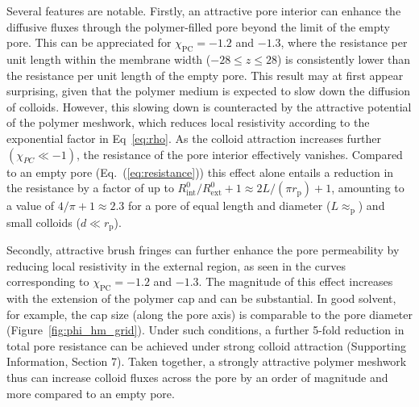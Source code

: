 \documentclass[12pt, a4paper]{article}
\begin{document}
Several features are notable. Firstly, an attractive pore interior can enhance the diffusive fluxes through the polymer-filled pore beyond the limit of the empty pore.
This can be appreciated for $\chi_{\text{PC}} = -1.2$ and $-1.3$, where the resistance per unit length within the membrane width ($-28 \leq z \leq 28$) is consistently lower than the resistance per unit length of the empty pore.
This result may at first appear surprising, given that the polymer medium is expected to slow down the diffusion of colloids.
However, this slowing down is counteracted by the attractive potential of the polymer meshwork, which reduces local resistivity according to the exponential factor in Eq~\ref{eq:rho}.
As the colloid attraction increases further $(\chi_{PC}\ll -1)$, the resistance of the pore interior effectively vanishes.
Compared to an empty pore (Eq.~(\ref{eq:resistance})) this effect alone entails a reduction in the resistance by a factor of up to $R^0_{\text{int}}/R^0_{\text{ext}}+1 \approx 2L/(\pi r_{\text{p}})+1$, amounting to a value of $4/\pi+1 \approx 2.3$ for a pore of equal length and diameter ($L \approx_{\text{p}}$) and small colloids ($d\ll r_{\text{p}}$). 

Secondly, attractive brush fringes can further enhance the pore permeability by reducing local resistivity in the external region, as seen in the curves corresponding to $\chi_{\text{PC}} = -1.2$ and $-1.3$.
The magnitude of this effect increases with the extension of the polymer cap and can be substantial. In good solvent, for example, the cap size (along the pore axis) is comparable to the pore diameter (Figure~\ref{fig:phi_hm_grid}). Under such conditions, a further 5-fold reduction in total pore resistance can be achieved under strong colloid attraction (Supporting Information, Section 7).
Taken together, a strongly attractive polymer meshwork thus can increase colloid fluxes across the pore by an order of magnitude and more compared to an empty pore.


\end{document}
